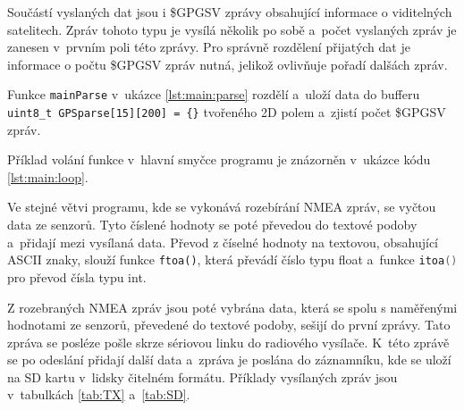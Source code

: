 \documentclass[twoside]{ctuthesis}
\theoremstyle{plain}
\theoremstyle{definition}
\theoremstyle{note}
\begin{document}
		Součástí vyslaných dat jsou i \$GPGSV zprávy obsahující informace o viditelných satelitech. Zpráv tohoto typu je vysílá několik po sobě a~počet vyslaných zpráv je zanesen v~prvním poli této zprávy. Pro správně rozdělení přijatých dat je informace o počtu \$GPGSV zpráv nutná, jelikož ovlivňuje pořadí dalšách zpráv.

		Funkce \lstinline[language=C] |mainParse| v~ukázce \ref{lst:main:parse} rozdělí a~uloží data do bufferu \lstinline |uint8_t GPSparse[15][200] = {}|   tvořeného 2D polem a~zjistí počet \$GPGSV zpráv.

		



		Příklad volání funkce v~hlavní smyčce programu je znázorněn v~ukázce kódu \ref{lst:main:loop}.
		

		Ve stejné větvi programu, kde se vykonává rozebírání NMEA zpráv, se vyčtou data ze senzorů. Tyto číslené hodnoty se poté převedou do textové podoby a~přidají mezi vysílaná data. Převod z číselné hodnoty na textovou, obsahující ASCII znaky, slouží funkce \lstinline |ftoa()|, která převádí číslo typu float a~funkce \lstinline[language=C] |itoa()| pro převod čísla typu int. 

		Z rozebraných NMEA zpráv jsou poté vybrána data, která se spolu s naměřenými hodnotami ze senzorů, převedené do textové podoby, sešijí do první zprávy. Tato zpráva se posléze pošle skrze sériovou linku do radiového vysílače. K~této zprávě se po odeslání přidají další data a~zpráva je poslána do záznamníku, kde se uloží na SD kartu v~lidsky čitelném formátu. Příklady vysílaných zpráv jsou v~tabulkách \ref{tab:TX} a~\ref{tab:SD}.
\end{document}
